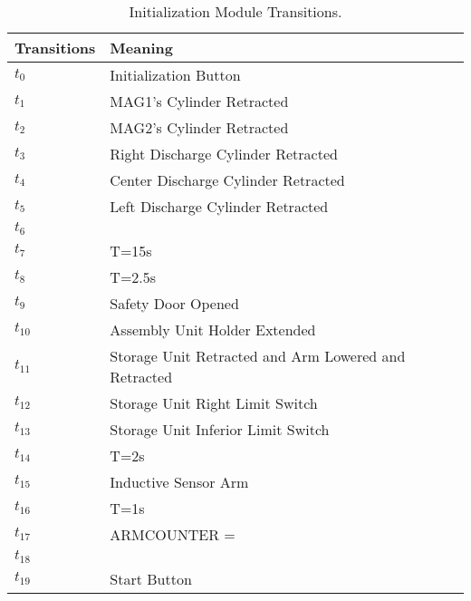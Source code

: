 \begin{table}[H]
\caption{Initialization Module Transitions.}
\centering
\begin{tabular}{M{5cm}M{10cm}}
Transitions & Meaning\\
\hline
\hyperlink{partialNet:t01}{\hypertarget{partialTable:t0}{$t_{0}$}} & Initialization Button\\
\hyperlink{partialNet:t11}{\hypertarget{partialTable:t1}{$t_{1}$}} & MAG1's Cylinder Retracted\\
\hyperlink{partialNet:t21}{\hypertarget{partialTable:t2}{$t_{2}$}} & MAG2's Cylinder Retracted\\
\hyperlink{partialNet:t31}{\hypertarget{partialTable:t3}{$t_{3}$}} & Right Discharge Cylinder Retracted\\
\hyperlink{partialNet:t41}{\hypertarget{partialTable:t4}{$t_{4}$}} & Center Discharge Cylinder Retracted\\
\hyperlink{partialNet:t51}{\hypertarget{partialTable:t5}{$t_{5}$}} & Left Discharge Cylinder Retracted\\
\hyperlink{partialNet:t61}{\hypertarget{partialTable:t6}{$t_{6}$}} & \\
\hyperlink{partialNet:tt71}{\hypertarget{partialTable:tt7}{$t_{7}$}} & T=15s\\
\hyperlink{partialNet:tt81}{\hypertarget{partialTable:tt8}{$t_{8}$}} & T=2.5s\\
\hyperlink{partialNet:t91}{\hypertarget{partialTable:t9}{$t_{9}$}} & Safety Door Opened\\
\hyperlink{partialNet:t101}{\hypertarget{partialTable:t10}{$t_{10}$}} & Assembly Unit Holder Extended\\
\hyperlink{partialNet:t111}{\hypertarget{partialTable:t11}{$t_{11}$}} & Storage Unit Retracted and Arm Lowered and Retracted\\
\hyperlink{partialNet:t121}{\hypertarget{partialTable:t12}{$t_{12}$}} & Storage Unit Right Limit Switch\\
\hyperlink{partialNet:t131}{\hypertarget{partialTable:t13}{$t_{13}$}} & Storage Unit Inferior Limit Switch\\
\hyperlink{partialNet:tt141}{\hypertarget{partialTable:tt14}{$t_{14}$}} & T=2s\\
\hyperlink{partialNet:t151}{\hypertarget{partialTable:t15}{$t_{15}$}} & Inductive Sensor Arm\\
\hyperlink{partialNet:tt161}{\hypertarget{partialTable:tt16}{$t_{16}$}} & T=1s\\
\hyperlink{partialNet:t171}{\hypertarget{partialTable:t17}{$t_{17}$}} & ARMCOUNTER = \\
\hyperlink{partialNet:t181}{\hypertarget{partialTable:t18}{$t_{18}$}} & \\
\hyperlink{partialNet:t191}{\hypertarget{partialTable:t19}{$t_{19}$}} & Start Button\\
\end{tabular}
\end{table}
